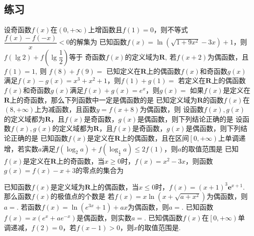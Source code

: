 \documentclass{BHCexam}
\begin{document}
\subsection{练习}
\begin{questions}
\qs 设奇函数$f(x)$在$ \left(0,+\infty\right) $上增函数且$ f(1)=0 $，则不等式$ \dfrac{f(x)-f(-x)}{x}<0 $的解集为\xx
{}
\qs 已知函数$f(x)=\ln \left(\sqrt{1+9x^2}-3x\right)+1$，则$ f(\lg2)+f\left(\lg\dfrac{1}{2}\right) $等于\xx
{}
\qs 奇函数$f(x)$的定义域为$ \mathbf{R} ,~$若$ f(x+2) $为偶函数，且$ f(1)=1,~ $则 $f(8)+f(9)=$\xx
{}
\qs 已知定义在$ \mathbf{R} $上的偶函数$f(x)$和奇函数$g(x)$满足$ f(x)-g(x)=x^3+x^2+1 $，则$ f(1)+g(1)= $\xx
{}
\qs 若定义在$\mathbf{R}$上的偶函数$f(x)$和奇函数$g(x)$满足$ f(x)+g(x)=e^x $，则$ g(x)= $\xx
{}
\qs 如果$f(x)$是定义在$\mathbf{R}$上的奇函数，那么下列函数中一定是偶函数的是\xx
{}
\qs 已知定义域为$\mathbf{R} $的函数$f(x)$在$ \left(8,+\infty\right) $上为减函数，且函数$y=f(x+8)$为偶函数，则\xx
{}
\question
设函数$f(x),g(x)$的定义域都为$\mathbf{R}$，且$f(x)$是奇函数，$g(x)$是偶函数，则下列结论正确的是\xx
{}
\question
设函数$f(x),g(x)$的定义域都为$\mathbf{R}$，且$f(x)$是奇函数，$g(x)$是偶函数，则下列结论正确的是\xx
{}
\qs 已知函数$f(x)$是定义在$ \mathbf{R} $上的偶函数，且在区间$ \left[0,+\infty\right) $上单调递增，若实数$ a $满足$ f(\log_2a) +f(\log_\frac{1}{2}a)\le 2f(1)$，则$ a $的取值范围是\xx
\twoch{$ \left[1,2\right]$}{$ \left(0,\dfrac{1}{2}\right]$}{$ \left[\dfrac{1}{2},2\right]$}{$ \left(0,2\right]$}
\qs 已知$f(x)$是定义在$ \mathbf{R} $上的奇函数，当$ x\ge 0 $时，$f(x)=x^2-3x$，则函数$ g(x)=f(x)-x+3 $的零点的集合为\xx
{}


\qs 已知函数$f(x)$是定义域为$ \mathbf{R} $上的偶函数，当$ x\le0 $时，$f(x)=\left(x+1\right)^3\bm{e}^{x+1}$.那么函数$f(x)$的极值点的个数是\xx
{}
\qs 若$f(x)=x\ln (x+\sqrt{a+x^2})$为偶函数，则$ a= $\tk.
\qs 若函数$f(x)=\ln (e^{3x}+1)+ax$为偶函数，则$ a= $\tk.
\qs 已知函数$f(x)=x\left(e^x+ae^{-x}\right)$是偶函数，则实数$ a= $\tk.
\qs 已知偶函数$f(x)$在$ \left[0,+\infty\right) $单调递减，$ f(2)=0 $，若$f(x-1)>0$，则$ x $的取值范围是\tk.


\end{questions}
\end{document}
